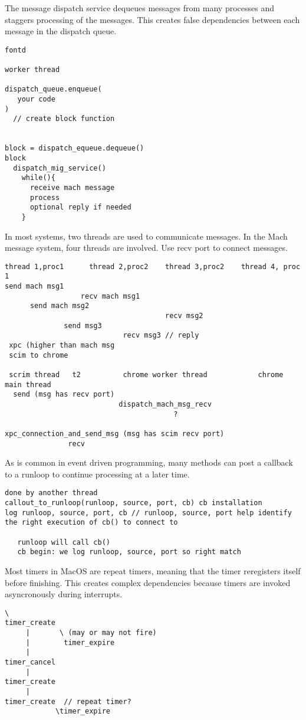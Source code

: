 The message dispatch service dequeues messages from many processes and staggers
processing of the messages. This creates false dependencies between each
message in the dispatch queue.
{\footnotesize \begin{verbatim}
fontd

worker thread

dispatch_queue.enqueue(
   your code
)
  // create block function


block = dispatch_equeue.dequeue()
block
  dispatch_mig_service()
    while(){
      receive mach message
      process
      optional reply if needed
    }
\end{verbatim}
}

In most systems, two threads are used to communicate messages.
In the Mach message system, four threads are involved.
Use recv port to connect messages.

{\footnotesize \begin{verbatim}
thread 1,proc1      thread 2,proc2    thread 3,proc2    thread 4, proc 1
send mach msg1
                  recv mach msg1
      send mach msg2
                                      recv msg2
              send msg3
                            recv msg3 // reply
 xpc (higher than mach msg
 scim to chrome

 scrim thread   t2          chrome worker thread            chrome main thread
  send (msg has recv port)
                           dispatch_mach_msg_recv
                                        ?

xpc_connection_and_send_msg (msg has scim recv port)
               recv
\end{verbatim}
}

As is common in event driven programming, many methods can post a callback to a runloop to continue processing at a later time.

{\footnotesize \begin{verbatim}
done by another thread
callout_to_runloop(runloop, source, port, cb) cb installation
log runloop, source, port, cb // runloop, source, port help identify
the right execution of cb() to connect to

   runloop will call cb()
   cb begin: we log runloop, source, port so right match
\end{verbatim}
}

Most timers in MacOS are repeat timers, meaning that the timer reregisters itself before finishing.
This creates complex dependencies because timers are invoked asyncronously during interrupts.


{\footnotesize \begin{verbatim}
\
timer_create
     |       \ (may or may not fire)
     |        timer_expire
     |
timer_cancel
     |
timer_create
     |
timer_create  // repeat timer?
            \timer_expire

\end{verbatim}
}
